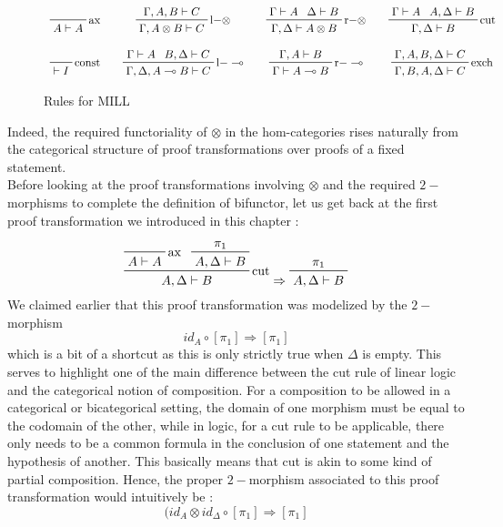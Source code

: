 \documentclass[a4paper, 12pt, twoside,openright]{report}
\begin{document}
 \begin{figure}
 \begin{center}
$$ \begin{array}{ccccccc}
 \prftree[r]{ax}{A\vdash A}&& 
 \prftree[r]{l$-\otimes$}{\Gamma,A,B \vdash C}{\Gamma, A\otimes B \vdash C}&&
 \prftree[r]{r$-\otimes$}{\Gamma \vdash A}{\Delta \vdash B}{\Gamma,\Delta \vdash A \otimes B}&&
 \prftree[r]{cut}{\Gamma \vdash A}{A,\Delta \vdash B}{\Gamma,\Delta \vdash B}\\
 &&&&&&\\
 \prftree[r]{const}{\vdash I}&&
 \prftree[r]{l$-\multimap$}{\Gamma \vdash A}{B,\Delta \vdash C}{\Gamma,\Delta,A\multimap B \vdash C}&&
 \prftree[r]{r$-\multimap$}{\Gamma ,  A \vdash B}{\Gamma \vdash A \multimap B}&&
 \prftree[r]{exch}{\Gamma,A,B,\Delta \vdash C}{\Gamma,B,A,\Delta \vdash C}\\
 \end{array}$$
 \end{center}
 \caption{Rules for MILL \label{figure/MILLrules}}
 \end{figure}


Indeed, the required functoriality of $\otimes$ in the hom-categories rises naturally from the categorical structure of proof transformations over proofs of a fixed statement. \\

Before looking at the proof transformations involving $\otimes$ and the required $2-$morphisms to complete the definition of bifunctor, let us get back at the first proof transformation we introduced in this chapter : 
$$
\prftree[r]{cut}
	{\prftree[r]{ax}
		{A\vdash A}
	}
	{\prftree{\pi_1}{A,\Delta \vdash B}
	}
	{A,\Delta \vdash B}
\Rightarrow
\prftree{\pi_1}{A,\Delta \vdash B}
$$
We claimed earlier that this proof transformation was modelized by the $2-$ morphism $$id_A \circ [\pi_1] \Rightarrow [\pi_1]$$ which is a bit of a shortcut as this is only strictly true when $\Delta$ is empty. This serves to highlight one of the main difference between the cut rule of linear logic and the categorical notion of composition. For a composition to be allowed in a categorical or bicategorical setting, the domain of one morphism must be equal to the codomain of the other, while in logic, for a cut rule to be applicable, there only needs to be a common formula in the conclusion of one statement and the hypothesis of another. This basically means that cut is akin to some kind of partial composition. Hence, the proper $2-$morphism associated to this proof transformation would intuitively be : $$(id_A \otimes id_{\Delta} \circ [\pi_1] \Rightarrow [\pi_1]$$
\end{document}
